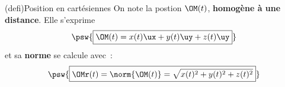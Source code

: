 \documentclass[../../main/main.tex]{subfiles}
\begin{document}
\begin{tcb}[sidebyside, righthand ratio=.25](defi){Position en cartésiennes}
	On note la postion $\OM(t)$, \textbf{homogène à une distance}. Elle s'exprime
	\[\psw{\boxed{\OM(t) = x(t)\ux + y(t)\uy + z(t)\uy}}\]
	et sa \textbf{norme} se calcule avec~:
	\[\psw{\boxed{\OMr(t) = \norm{\OM(t)} = \sqrt{x(t)^2 + y(t)^2 + z(t)^2}}}\]
	\tcblower
	\begin{center}
		\vspace{-15pt}
		\captionsetup{justification=centering}
	\end{center}
\end{tcb}
\end{document}
